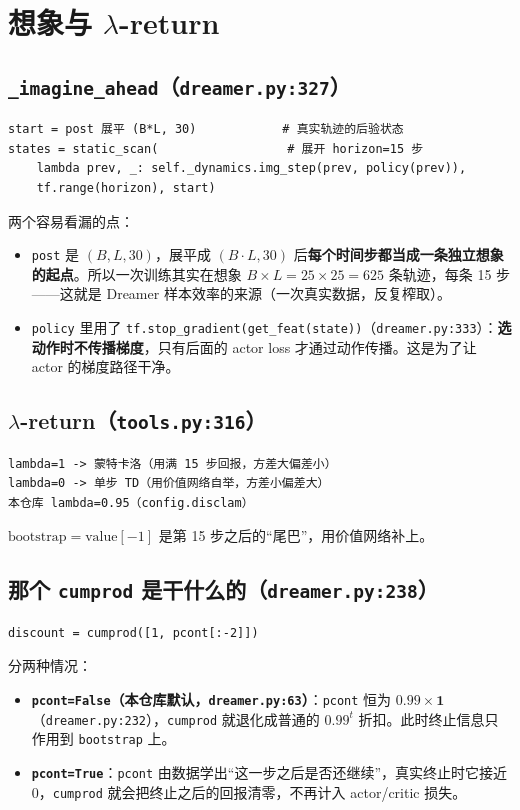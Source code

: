 \documentclass[11pt]{ctexart}
\begin{document}
\section{想象与 $\lambda$-return}

\subsection{\texttt{\_imagine\_ahead}（\texttt{dreamer.py:327}）}
\begin{Verbatim}[frame=single,fontsize=\small]
start = post 展平 (B*L, 30)            # 真实轨迹的后验状态
states = static_scan(                  # 展开 horizon=15 步
    lambda prev, _: self._dynamics.img_step(prev, policy(prev)),
    tf.range(horizon), start)
\end{Verbatim}

两个容易看漏的点：
\begin{itemize}
  \item \texttt{post} 是 $(B,L,30)$，展平成 $(B\cdot L,30)$ 后\textbf{每个时间步都当成一条独立想象的起点}。所以一次训练其实在想象 $B\times L = 25\times25 = 625$ 条轨迹，每条 15 步——这就是 Dreamer 样本效率的来源（一次真实数据，反复榨取）。
  \item \texttt{policy} 里用了 \texttt{tf.stop\_gradient(get\_feat(state))}（\texttt{dreamer.py:333}）：\textbf{选动作时不传播梯度}，只有后面的 actor loss 才通过动作传播。这是为了让 actor 的梯度路径干净。
\end{itemize}

\subsection{$\lambda$-return（\texttt{tools.py:316}）}
\begin{Verbatim}[frame=single,fontsize=\small]
lambda=1 -> 蒙特卡洛（用满 15 步回报，方差大偏差小）
lambda=0 -> 单步 TD（用价值网络自举，方差小偏差大）
本仓库 lambda=0.95（config.disclam）
\end{Verbatim}
$\mathrm{bootstrap}=\mathrm{value}[-1]$ 是第 15 步之后的``尾巴''，用价值网络补上。

\subsection{那个 \texttt{cumprod} 是干什么的（\texttt{dreamer.py:238}）}
\begin{Verbatim}[frame=single,fontsize=\small]
discount = cumprod([1, pcont[:-2]])
\end{Verbatim}
分两种情况：
\begin{itemize}
  \item \textbf{\texttt{pcont=False}（本仓库默认，\texttt{dreamer.py:63}）}：\texttt{pcont} 恒为 $0.99 \times \mathbf{1}$（\texttt{dreamer.py:232}），\texttt{cumprod} 就退化成普通的 $0.99^t$ 折扣。此时终止信息只作用到 \texttt{bootstrap} 上。
  \item \textbf{\texttt{pcont=True}}：\texttt{pcont} 由数据学出``这一步之后是否还继续''，真实终止时它接近 0，\texttt{cumprod} 就会把终止之后的回报清零，不再计入 actor/critic 损失。
\end{itemize}
\end{document}
